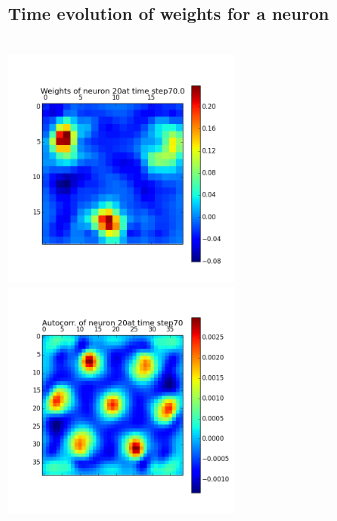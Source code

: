 \begin{frame}
\frametitle{Time evolution of weights for a neuron}
\begin{columns}[t]
\centering
\includegraphics[width=6cm,height=6cm]{neurons/neuron_w_20_t_70.png}\\
\centering
\includegraphics[width=6cm,height=6cm]{neurons/neuron_a_20_t_70.png}\\
\end{columns}
\end{frame}

